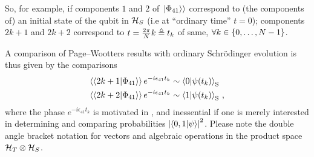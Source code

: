 So, for example, if components $1$ and $2$ of $\left.\left| \Phi_{41} \right\rangle\right\rangle$ correspond to
(the components of)
an initial state of the qubit in $\mathcal{H}_S$
(i.e at ``ordinary time'' $t=0$); components
$2k + 1$ and $2k + 2$ correspond to $t = \frac{2\pi}{N}k \triangleq t_k$
of same, $\forall k \in \qty{0, \dots, N-1}$.

A comparison of Page--Wootters results with ordinary
Schr{\"o}dinger evolution is thus given by the comparisons
\begin{align}
  \left\langle\left\langle 2k+1 \middle| \Phi_{41} \right\rangle\right\rangle e^{-i \epsilon_{41} t_k} &\sim \braket{0}{\psi(t_k)}_{\mathrm{S}} \label{eq:comparison0} \\
  \left\langle\left\langle 2k+2 \middle| \Phi_{41} \right\rangle\right\rangle e^{-i \epsilon_{41} t_k} &\sim \braket{1}{\psi(t_k)}_{\mathrm{S}} \label{eq:comparison1}
  \,\text{,}
\end{align}
where the phase $e^{-i \epsilon_{41} t_k}$ is motivated in \cite[\S ``The Zero-eigenvalue'']{Lloyd:Time},
and inessential if one is merely interested in determining and comparing probabilities
$\qty|\braket{0,1}{\psi}|^2$. Please note the double angle bracket notation for vectors
and algebraic operations in the product space $\mathcal{H}_T \otimes \mathcal{H}_S$.


